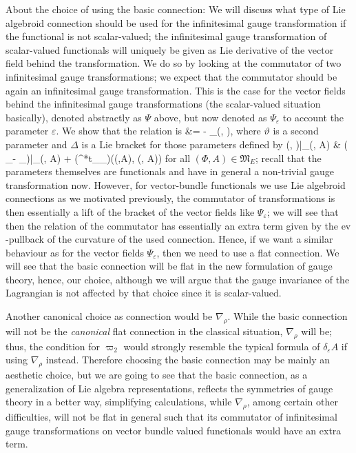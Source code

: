 About the choice of using the basic connection: We will discuss what type of Lie algebroid connection should be used for the infinitesimal gauge transformation if the functional is not scalar-valued; the infinitesimal gauge transformation of scalar-valued functionals will uniquely be given as Lie derivative of the vector field behind the transformation. We do so by looking at the commutator of two infinitesimal gauge transformations; we expect that the commutator should be again an infinitesimal gauge transformation. This is the case for the vector fields behind the infinitesimal gauge transformations (the scalar-valued situation basically), denoted abstractly as $\Psi$ above, but now denoted as $\Psi_\varepsilon$ to account the parameter $\varepsilon$. We show that the relation is
\bas
[\Psi_\vartheta, \Psi_\varepsilon]
&=
- \Psi_{\Delta(\vartheta, \varepsilon)},
\eas
where $\vartheta$ is a second parameter and $\Delta$ is a Lie bracket for those parameters defined by
\bas
\Delta(\vartheta, \varepsilon)|_{(\Phi, A)}
&\coloneqq
\mleft( \delta_\varepsilon \vartheta - \delta_\vartheta \varepsilon \mright)|_{(\Phi, A)}
	+ (\Phi^*t_{\nabla_\rho})\bigl(\vartheta(\Phi,A), \varepsilon(\Phi, A)\bigr)
\eas
for all $(\Phi, A) \in \mathfrak{M}_E$; recall that the parameters themselves are functionals and have in general a non-trivial gauge transformation now. However, for vector-bundle functionals we use Lie algebroid connections as we motivated previously, the commutator of transformations is then essentially a lift of the bracket of the vector fields like $\Psi_\varepsilon$; we will see that then the relation of the commutator has essentially an extra term given by the $\mathrm{ev}$-pullback of the curvature of the used connection. Hence, if we want a similar behaviour as for the vector fields $\Psi_\varepsilon$, then we need to use a flat connection. We will see that the basic connection will be flat in the new formulation of gauge theory, hence, our choice, although we will argue that the gauge invariance of the Lagrangian is not affected by that choice since it is scalar-valued. 

Another canonical choice as connection would be $\nabla_\rho$. While the basic connection will not be the \emph{canonical} flat connection in the classical situation, $\nabla_\rho$ will be; thus, the condition for $\varpi_2$ would strongly resemble the typical formula of $\delta_\varepsilon A$ if using $\nabla_\rho$ instead. Therefore choosing the basic connection may be mainly an aesthetic choice, but we are going to see that the basic connection, as a generalization of Lie algebra representations, reflects the symmetries of gauge theory in a better way, simplifying calculations, while $\nabla_\rho$, among certain other difficulties, will not be flat in general such that its commutator of infinitesimal gauge transformations on vector bundle valued functionals would have an extra term.

